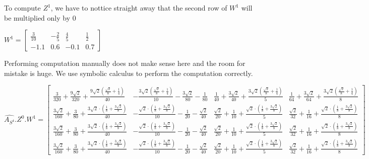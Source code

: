 \documentclass[a4paper]{article}
\begin{document}
To compute $Z^{1}$, we have to nottice straight away that the second row of $W^{1}$ will be multiplied only by $0$

$W^{1} = \left[\begin{matrix}\frac{3}{10} & - \frac{2}{5} & \frac{4}{5} & \frac{1}{2}\\-1.1 & 0.6 & -0.1 & 0.7\end{matrix}\right]$

Performing computation manually does not make sense here and the room for mistake is huge.
We use symbolic calculus to perform the computation correctly.

$\hat{A_{S^4}}.Z^{0}. W^{1} = 
\left[\begin{matrix}\frac{3}{320} + \frac{9 \sqrt{2}}{320} + \frac{9 \sqrt{2} \left(\frac{\sqrt{2}}{8} + \frac{1}{4}\right)}{40} & - \frac{3 \sqrt{2} \left(\frac{\sqrt{2}}{8} + \frac{1}{4}\right)}{10} - \frac{3 \sqrt{2}}{80} - \frac{1}{80} & \frac{1}{40} + \frac{3 \sqrt{2}}{40} + \frac{3 \sqrt{2} \left(\frac{\sqrt{2}}{8} + \frac{1}{4}\right)}{5} & \frac{1}{64} + \frac{3 \sqrt{2}}{64} + \frac{3 \sqrt{2} \left(\frac{\sqrt{2}}{8} + \frac{1}{4}\right)}{8}\\\frac{3 \sqrt{2}}{160} + \frac{3}{80} + \frac{3 \sqrt{2} \cdot \left(\frac{1}{8} + \frac{3 \sqrt{2}}{8}\right)}{40} & - \frac{\sqrt{2} \cdot \left(\frac{1}{8} + \frac{3 \sqrt{2}}{8}\right)}{10} - \frac{1}{20} - \frac{\sqrt{2}}{40} & \frac{\sqrt{2}}{20} + \frac{1}{10} + \frac{\sqrt{2} \cdot \left(\frac{1}{8} + \frac{3 \sqrt{2}}{8}\right)}{5} & \frac{\sqrt{2}}{32} + \frac{1}{16} + \frac{\sqrt{2} \cdot \left(\frac{1}{8} + \frac{3 \sqrt{2}}{8}\right)}{8}\\\frac{3 \sqrt{2}}{160} + \frac{3}{80} + \frac{3 \sqrt{2} \cdot \left(\frac{1}{8} + \frac{3 \sqrt{2}}{8}\right)}{40} & - \frac{\sqrt{2} \cdot \left(\frac{1}{8} + \frac{3 \sqrt{2}}{8}\right)}{10} - \frac{1}{20} - \frac{\sqrt{2}}{40} & \frac{\sqrt{2}}{20} + \frac{1}{10} + \frac{\sqrt{2} \cdot \left(\frac{1}{8} + \frac{3 \sqrt{2}}{8}\right)}{5} & \frac{\sqrt{2}}{32} + \frac{1}{16} + \frac{\sqrt{2} \cdot \left(\frac{1}{8} + \frac{3 \sqrt{2}}{8}\right)}{8}\\\frac{3 \sqrt{2}}{160} + \frac{3}{80} + \frac{3 \sqrt{2} \cdot \left(\frac{1}{8} + \frac{3 \sqrt{2}}{8}\right)}{40} & - \frac{\sqrt{2} \cdot \left(\frac{1}{8} + \frac{3 \sqrt{2}}{8}\right)}{10} - \frac{1}{20} - \frac{\sqrt{2}}{40} & \frac{\sqrt{2}}{20} + \frac{1}{10} + \frac{\sqrt{2} \cdot \left(\frac{1}{8} + \frac{3 \sqrt{2}}{8}\right)}{5} & \frac{\sqrt{2}}{32} + \frac{1}{16} + \frac{\sqrt{2} \cdot \left(\frac{1}{8} + \frac{3 \sqrt{2}}{8}\right)}{8}\end{matrix}\right]$
\end{document}
